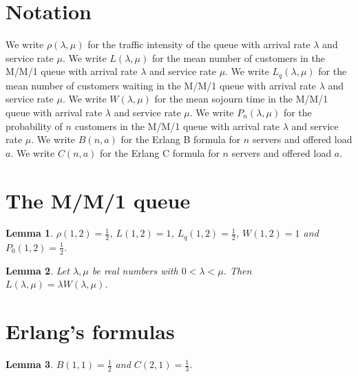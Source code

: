\documentclass{article}
\newtheorem{lemma}{Lemma}
\begin{document}
\section{Notation}

We write $\rho(\lambda,\mu)$ for the traffic intensity of the queue with arrival rate $\lambda$ and service rate $\mu$.
We write $L(\lambda,\mu)$ for the mean number of customers in the M/M/1 queue with arrival rate $\lambda$ and service rate $\mu$.
We write $L_q(\lambda,\mu)$ for the mean number of customers waiting in the M/M/1 queue with arrival rate $\lambda$ and service rate $\mu$.
We write $W(\lambda,\mu)$ for the mean sojourn time in the M/M/1 queue with arrival rate $\lambda$ and service rate $\mu$.
We write $P_n(\lambda,\mu)$ for the probability of $n$ customers in the M/M/1 queue with arrival rate $\lambda$ and service rate $\mu$.
We write $B(n,a)$ for the Erlang B formula for $n$ servers and offered load $a$.
We write $C(n,a)$ for the Erlang C formula for $n$ servers and offered load $a$.

\section{The M/M/1 queue}

\begin{lemma}\label{example}
$\rho(1,2)=\frac12$, $L(1,2)=1$, $L_q(1,2)=\frac12$, $W(1,2)=1$ and $P_0(1,2)=\frac12$.
\end{lemma}

\begin{lemma}\label{little}
Let $\lambda,\mu$ be real numbers with $0<\lambda<\mu$. Then $L(\lambda,\mu)=\lambda W(\lambda,\mu)$.
\end{lemma}

\section{Erlang's formulas}

\begin{lemma}\label{erlang}
$B(1,1)=\frac12$ and $C(2,1)=\frac13$.
\end{lemma}
\end{document}
